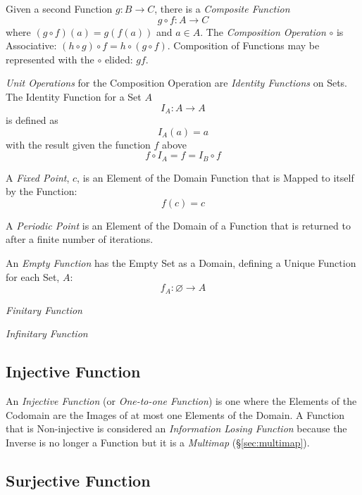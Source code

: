 Given a second Function $g : B \rightarrow C$, there is a
\emph{Composite Function}
\[
    g \circ f : A \rightarrow C
\]
where $(g \circ f)(a) = g(f(a))$ and $a \in A$. The \emph{Composition
  Operation} $\circ$ is Associative: $(h \circ g) \circ f = h \circ (g
\circ f)$. Composition of Functions may be represented with the
$\circ$ elided: $gf$.

\emph{Unit Operations} for the Composition Operation are
\emph{Identity Functions} on Sets. The Identity Function for a Set $A$
\[
    I_A : A \rightarrow A
\]
is defined as
\[
    I_A(a) = a
\]
with the result given the function $f$ above
\[
    f \circ I_A = f = I_B \circ f
\]

A \emph{Fixed Point}, $c$, is an Element of the Domain Function that
is Mapped to itself by the Function:
\[
    f(c) = c
\]

A \emph{Periodic Point} is an Element of the Domain of a Function that
is returned to after a finite number of iterations.

An \emph{Empty Function} has the Empty Set as a Domain, defining a
Unique Function for each Set, $A$:
\[
    f_A : \varnothing \rightarrow A
\]

\emph{Finitary Function}

\emph{Infinitary Function}



\subsection{Injective Function}\label{sec:injective_function}

An \emph{Injective Function} (or \emph{One-to-one Function}) is one
where the Elements of the Codomain are the Images of at most one
Elements of the Domain. A Function that is Non-injective is considered
an \emph{Information Losing Function} because the Inverse is no longer
a Function but it is a \emph{Multimap} (\S\ref{sec:multimap}).



\subsection{Surjective Function}\label{sec:surjective_function}

